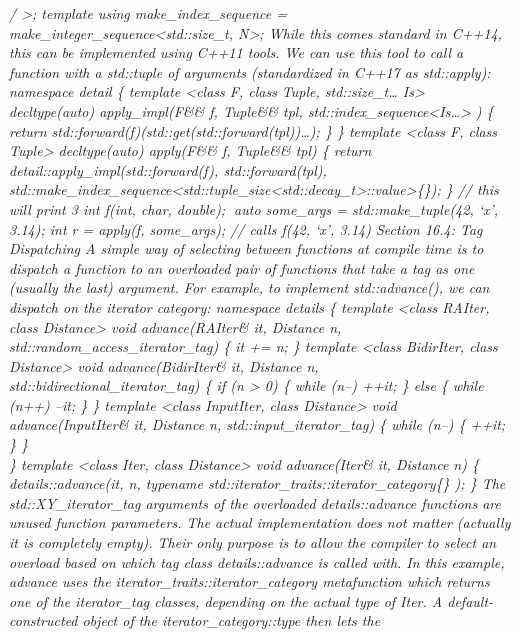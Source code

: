\emph{/ \textgreater; template using make\_index\_sequence =
make\_integer\_sequence\textless std::size\_t, N\textgreater; While this
comes standard in C++14, this can be implemented using C++11 tools. We
can use this tool to call a function with a std::tuple of arguments
(standardized in C++17 as std::apply): namespace detail \{ template
\textless class F, class Tuple, std::size\_t\ldots{} Is\textgreater{}
decltype(auto) apply\_impl(F\&\& f, Tuple\&\& tpl,
std::index\_sequence\textless Is\ldots\textgreater{} ) \{ return
std::forward(f)(std::get(std::forward(tpl))\ldots); \} \} template
\textless class F, class Tuple\textgreater{} decltype(auto) apply(F\&\&
f, Tuple\&\& tpl) \{ return detail::apply\_impl(std::forward(f),
std::forward(tpl),
std::make\_index\_sequence\textless std::tuple\_size\textless std::decay\_t\textgreater::value\textgreater\{\});
\} // this will print 3 int f(int, char, double); auto some\_args =
std::make\_tuple(42, `x', 3.14); int r = apply(f, some\_args); // calls
f(42, `x', 3.14) Section 16.4: Tag Dispatching A simple way of selecting
between functions at compile time is to dispatch a function to an
overloaded pair of functions that take a tag as one (usually the last)
argument. For example, to implement std::advance(), we can dispatch on
the iterator category: namespace details \{ template \textless class
RAIter, class Distance\textgreater{} void advance(RAIter\& it, Distance
n, std::random\_access\_iterator\_tag) \{ it += n; \} template
\textless class BidirIter, class Distance\textgreater{} void
advance(BidirIter\& it, Distance n, std::bidirectional\_iterator\_tag)
\{ if (n \textgreater{} 0) \{ while (n--) ++it; \} else \{ while (n++)
--it; \} \} template \textless class InputIter, class
Distance\textgreater{} void advance(InputIter\& it, Distance n,
std::input\_iterator\_tag) \{ while (n--) \{ ++it; \} \}\\
\} template \textless class Iter, class Distance\textgreater{} void
advance(Iter\& it, Distance n) \{ details::advance(it, n, typename
std::iterator\_traits::iterator\_category\{\} ); \} The
std::XY\_iterator\_tag arguments of the overloaded details::advance
functions are unused function parameters. The actual implementation does
not matter (actually it is completely empty). Their only purpose is to
allow the compiler to select an overload based on which tag class
details::advance is called with. In this example, advance uses the
iterator\_traits::iterator\_category metafunction which returns one of
the iterator\_tag classes, depending on the actual type of Iter. A
default-constructed object of the iterator\_category::type then lets the
}
